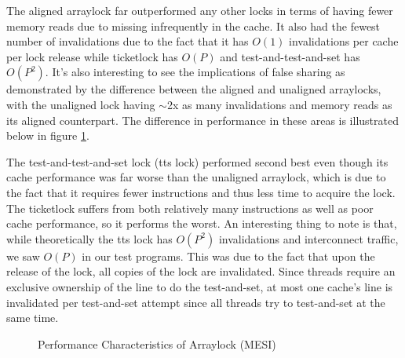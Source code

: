 \documentclass{article}
\begin{document}
The aligned arraylock far outperformed any other locks in terms of having fewer memory reads due to missing infrequently in the cache. It also had the fewest number of invalidations due to the fact that it has $O(1)$ invalidations per cache per lock release while ticketlock has $O(P)$ and test-and-test-and-set has $O(P^2)$. It's also interesting to see the implications of false sharing as demonstrated by the difference between the aligned and unaligned arraylocks, with the unaligned lock having $\sim$2x as many invalidations and memory reads as its aligned counterpart. The difference in performance in these areas is illustrated below in figure \ref{fig:arraylock}.

The test-and-test-and-set lock (tts lock) performed second best even though its cache performance was far worse than the unaligned arraylock, which is due to the fact that it requires fewer instructions and thus less time to acquire the lock.  The ticketlock suffers from both relatively many instructions as well as poor cache performance, so it performs the worst.  An interesting thing to note is that, while theoretically the tts lock has $O(P^2)$ invalidations and interconnect traffic, we saw $O(P)$ in our test programs. This was due to the fact that upon the release of the lock, all copies of the lock are invalidated.  Since threads require an exclusive ownership of the line to do the test-and-set, at most one cache's line is invalidated per test-and-set attempt since all threads try to test-and-set at the same time.

\begin{figure}[h]%
    \centering
    \qquad
    \caption{Performance Characteristics of Arraylock (MESI)}
    \label{fig:arraylock}
\end{figure}
\end{document}
